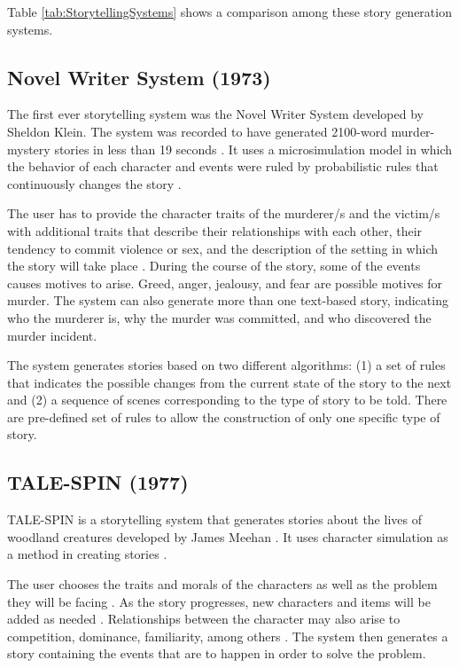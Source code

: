 Table \ref{tab:StorytellingSystems} shows a comparison among these story generation systems.

\subsection{Novel Writer System (1973)}
The first ever storytelling system was the Novel Writer System developed by Sheldon Klein. The system was recorded to have generated 2100-word murder-mystery stories in less than 19 seconds \cite{Gervas2012}. It uses a microsimulation model in which the behavior of each character and events were ruled by probabilistic rules that continuously changes the story \cite{Gervas2009}.

The user has to provide the character traits of the murderer/s and the victim/s with additional traits that describe their relationships with each other, their tendency to commit violence or sex, and the description of the setting in which the story will take place \cite{Gervas2012,  MendezGervasDeleon2014, LaclaustraLedesmaMendezGervas2014}. During the course of the story, some of the events causes motives to arise. Greed, anger, jealousy, and fear are possible motives for murder. The system can also generate more than one text-based story, indicating who the murderer is, why the murder was committed, and who discovered the murder incident.

The system generates stories based on two different algorithms: (1) a set of rules that indicates the possible changes from the current state of the story to the next and (2) a sequence of scenes corresponding to the type of story to be told. There are pre-defined set of rules to allow the construction of only one specific type of story.

\subsection{TALE-SPIN (1977)}
TALE-SPIN is a storytelling system that generates stories about the lives of  woodland creatures developed by James Meehan \cite{Gervas2009}. It uses character simulation as a method in creating stories \cite{Mawhorter2013}.

The user chooses the traits and morals of the characters as well as the problem they will be facing \cite{Gervas2009, Meehan1977}. As the story progresses, new characters and items will be added as needed \cite{Meehan1977}. Relationships between the character may also arise to competition, dominance, familiarity, among others \cite{Gervas2009}. The system then generates a story containing the events that are to happen in order to solve the problem.

